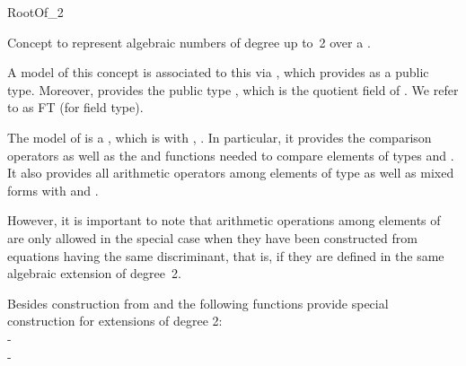 \begin{ccRefConcept}{RootOf_2}

\ccDefinition

Concept to represent algebraic numbers of degree up to~2 over  a   . 

A model of this concept is associated to this  via , which 
provides  as a public type. Moreover,  provides 
the public type , which is the quotient field of . 
We refer to   as {FT} (for field type).

The model of  is a  ,
 which is  with , . 
In particular, it provides the comparison operators \ccc{==, !=, <, >, <=, >=} as well as the 
and  functions needed to compare elements of types  and .
It also provides all arithmetic operators \ccc{+,-,*,/} among elements of type  as well as mixed forms with  and . 

However, it is important to note that arithmetic operations among elements of 
are only allowed in the special case when they have been constructed from equations having the 
same discriminant, that is, if they are defined in the same algebraic extension of degree~2. 

Besides construction from  and  the following functions provide 
special construction for extensions of degree 2:\\
-  \\
- 

\ccRefines
{}\\
\\
\\
\\


\end{ccRefConcept}
